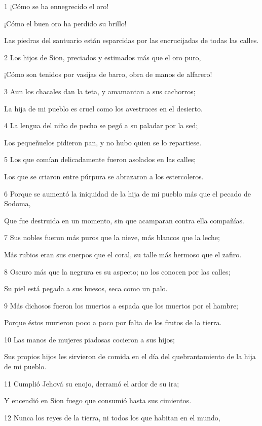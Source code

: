 \par 1 ¡Cómo se ha ennegrecido el oro!
\par ¡Cómo el buen oro ha perdido su brillo!
\par Las piedras del santuario están esparcidas por las encrucijadas de todas las calles.
\par 2 Los hijos de Sion, preciados y estimados más que el oro puro,
\par ¡Cómo son tenidos por vasijas de barro, obra de manos de alfarero!
\par 3 Aun los chacales dan la teta, y amamantan a sus cachorros;
\par La hija de mi pueblo es cruel como los avestruces en el desierto.
\par 4 La lengua del niño de pecho se pegó a su paladar por la sed;
\par Los pequeñuelos pidieron pan, y no hubo quien se lo repartiese.
\par 5 Los que comían delicadamente fueron asolados en las calles;
\par Los que se criaron entre púrpura se abrazaron a los estercoleros.
\par 6 Porque se aumentó la iniquidad de la hija de mi pueblo más que el pecado de Sodoma, 
\par Que fue destruida en un momento, sin que acamparan contra ella compañías.
\par 7 Sus nobles fueron más puros que la nieve, más blancos que la leche;
\par Más rubios eran sus cuerpos que el coral, su talle más hermoso que el zafiro.
\par 8 Oscuro más que la negrura es su aspecto; no los conocen por las calles;
\par Su piel está pegada a sus huesos, seca como un palo.
\par 9 Más dichosos fueron los muertos a espada que los muertos por el hambre;
\par Porque éstos murieron poco a poco por falta de los frutos de la tierra.
\par 10 Las manos de mujeres piadosas cocieron a sus hijos; 
\par Sus propios hijos les sirvieron de comida en el día del quebrantamiento de la hija de mi pueblo.
\par 11 Cumplió Jehová su enojo, derramó el ardor de su ira;
\par Y encendió en Sion fuego que consumió hasta sus cimientos.
\par 12 Nunca los reyes de la tierra, ni todos los que habitan en el mundo,
